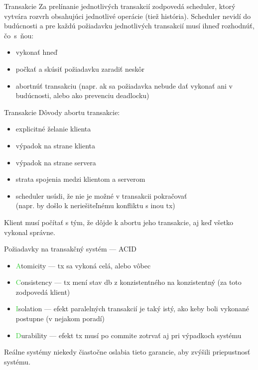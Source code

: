 \documentclass[12pt]{beamer}
\def\blue#1{\textcolor{Cerulean}{#1}}
\def\green#1{\textcolor{LimeGreen}{#1}}
\begin{document}
\begin{frame}[fragile]{Transakcie}
Za prelínanie jednotlivých transakcií zodpovedá \blue{scheduler},
ktorý vytvára \alert{rozvrh} obsahujúci jednotlivé operácie (tiež \alert{história}).
Scheduler nevidí do budúcnosti a pre každú požiadavku jednotlivých transakcií
musí ihneď rozhodnúť, čo~s~ňou:
\begin{itemize}
\item vykonať hneď
\item počkať a skúsiť požiadavku zaradiť neskôr
\item abortnúť transakciu (napr. ak sa požiadavka nebude dať vykonať ani v budúcnosti, alebo ako prevenciu deadlocku)
\end{itemize}
\end{frame}


\begin{frame}[fragile]{Transakcie}
Dôvody abortu transakcie:
\begin{itemize}
\item explicitné želanie klienta
\item výpadok na strane klienta
\item výpadok na strane servera
\item strata spojenia medzi klientom a serverom
\item scheduler usúdi, že nie je možné v transakcii pokračovať\\
    (napr. by došlo k neriešiteľnému konfliktu s inou tx)
\end{itemize}
Klient musí počítať s tým, že dôjde k abortu jeho transakcie, aj keď všetko vykonal správne.
\end{frame}


\begin{frame}[fragile]{Požiadavky na transakčný systém --- ACID}
\begin{itemize}
\item \green{A}tomicity --- tx sa vykoná celá, alebo vôbec
\item \green{C}onsistency --- tx mení stav db z konzistentného na konzistentný (za toto zodpovedá klient)
\item \green{I}solation --- efekt paralelných transakcií je taký istý, ako keby boli vykonané postupne (v nejakom poradí)
\item \green{D}urability --- efekt tx musí po commite zotrvať aj pri výpadkoch systému
\end{itemize}
Reálne systémy niekedy čiastočne oslabia tieto garancie, aby zvýšili priepustnosť systému.
\end{frame}
\end{document}

